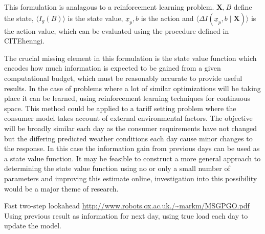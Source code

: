\documentclass[a4paper, 10 pt, conference]{ieeeconf}  %
\begin{document}
This formulation is analagous to a reinforcement learning problem. $\mathbf{X},B$ define the state, $\langle I_{g}(B)\rangle$ is the state value, $\underline{x}_{p},b$ is the action and $\langle\Delta I(\underline{x}_{p},b \mid \mathbf{X})\rangle$ is the action value, which can be evaluated using the procedure defined in CITEhenngi.

The crucial missing element in this formulation is the state value function which encodes how much information is expected to be gained from a given computational budget, which must be reasonably accurate to provide useful results. In the case of problems where a lot of similar optimizations will be taking place it can be learned, using reinforcement learning techniques for continuous space. This method could be applied to a tariff setting problem where the consumer model takes account of external environmental factors. The objective will be broadly similar each day as the consumer requirements have not changed but the differing predicted weather conditions each day cause minor changes to the response. In this case the information gain from previous days can be used as a state value function. It may be feasible to construct a more general approach to determining the state value function using no or only a small number of parameters and improving this estimate online, investigation into this possibility would be a major theme of research.



Fast two-step lookahead \url{http://www.robots.ox.ac.uk./~markm/MSGPGO.pdf}
Using previous result as information for next day, using true load each day to update the model.

\section*{}
\pagebreak
\singlespacing
\twocolumn



\end{document}
